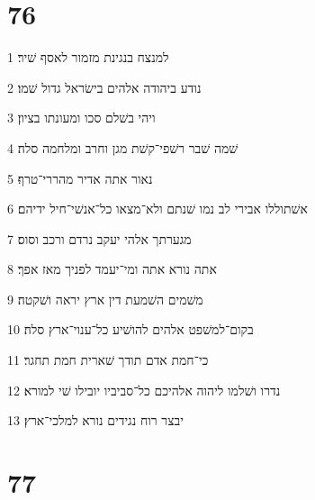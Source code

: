 \chapter{76}

\par 1 למנצח בנגינת מזמור לאסף שׁיר׃
\par 2 נודע ביהודה אלהים בישׂראל גדול שׁמו׃
\par 3 ויהי בשׁלם סכו ומעונתו בציון׃
\par 4 שׁמה שׁבר רשׁפי־קשׁת מגן וחרב ומלחמה סלה׃
\par 5 נאור אתה אדיר מהררי־טרף׃
\par 6 אשׁתוללו אבירי לב נמו שׁנתם ולא־מצאו כל־אנשׁי־חיל ידיהם׃
\par 7 מגערתך אלהי יעקב נרדם ורכב וסוס׃
\par 8 אתה נורא אתה ומי־יעמד לפניך מאז אפך׃
\par 9 משׁמים השׁמעת דין ארץ יראה ושׁקטה׃
\par 10 בקום־למשׁפט אלהים להושׁיע כל־ענוי־ארץ סלה׃
\par 11 כי־חמת אדם תודך שׁארית חמת תחגר׃
\par 12 נדרו ושׁלמו ליהוה אלהיכם כל־סביביו יובילו שׁי למורא׃
\par 13 יבצר רוח נגידים נורא למלכי־ארץ׃

\chapter{77}

